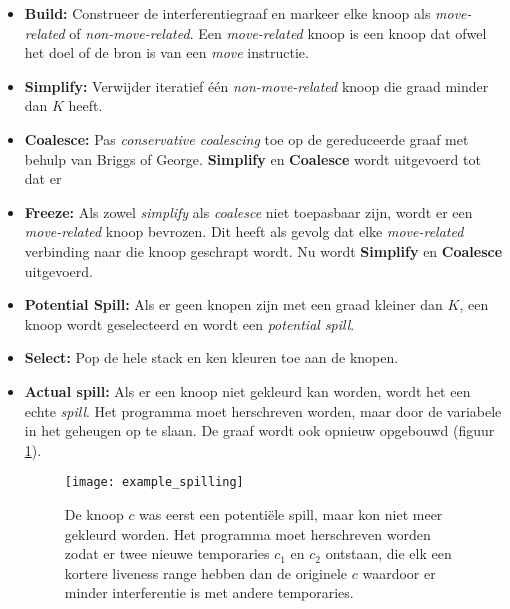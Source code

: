 \begin{itemize}
	\item \textbf{Build:} Construeer de interferentiegraaf en markeer elke knoop als \textit{move-related} of \textit{non-move-related}. Een \textit{move-related} knoop is een knoop dat ofwel het doel of de bron is van een \textit{move} instructie.
	\item \textbf{Simplify:} Verwijder iteratief één \textit{non-move-related} knoop die  graad minder dan $K$ heeft.
	\item \textbf{Coalesce:} Pas \textit{conservative coalescing} toe op de gereduceerde graaf met behulp van Briggs of George. \textbf{Simplify} en \textbf{Coalesce} wordt uitgevoerd tot dat er 
	\item \textbf{Freeze:} Als zowel \textit{simplify} als \textit{coalesce} niet toepasbaar zijn, wordt er een \textit{move-related} knoop bevrozen. Dit heeft als gevolg dat elke \textit{move-related} verbinding naar die knoop geschrapt wordt. Nu wordt \textbf{Simplify} en \textbf{Coalesce} uitgevoerd.
	\item \textbf{Potential Spill:} Als er geen knopen zijn met een graad kleiner dan $K$, een knoop wordt geselecteerd en wordt een \textit{potential spill}.
	\item \textbf{Select:} Pop de hele stack en ken kleuren toe aan de knopen.
	\item \textbf{Actual spill:} Als er een knoop niet gekleurd kan worden, wordt het een echte \textit{spill}. Het programma moet herschreven worden, maar door de variabele in het geheugen op te slaan. De graaf wordt ook opnieuw opgebouwd (figuur \ref{fig:example_spilling}).
	\begin{figure}[ht]
		\texttt{[image: example\_spilling]}
		\caption{De knoop $c$ was eerst een potentiële spill, maar kon niet meer gekleurd worden. Het programma moet herschreven worden zodat er twee nieuwe temporaries $c_1$ en $c_2$ ontstaan, die elk een kortere liveness range hebben dan de originele $c$ waardoor er minder interferentie is met andere temporaries.}
		\label{fig:example_spilling}
	\end{figure}

\end{itemize}